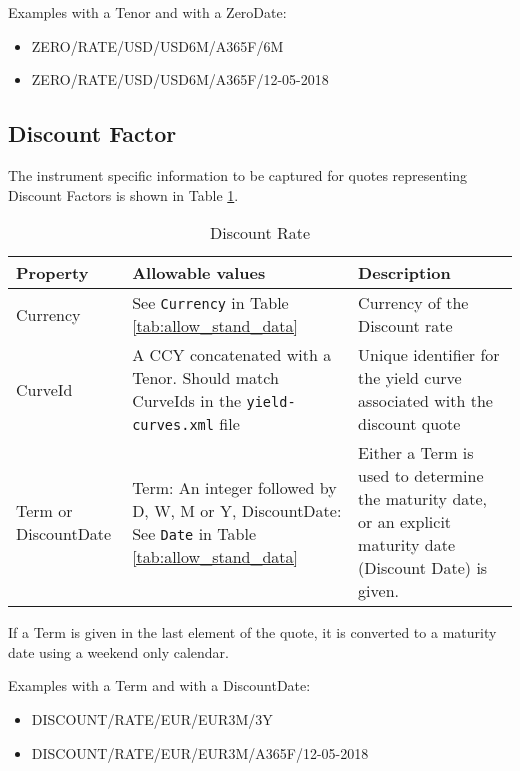 \medskip
Examples with a Tenor and with a ZeroDate: 
\begin{itemize}
\item {ZERO/RATE/USD/USD6M/A365F/6M}
\item {ZERO/RATE/USD/USD6M/A365F/12-05-2018}
\end{itemize}


\subsection{Discount Factor}\label{ss:discount_rate}

The instrument specific information to be captured for quotes representing Discount Factors is shown in Table \ref{tab:discount_quote}.

\begin{table}[H]
\centering
\begin{tabular}{|p{3.3cm}|p{5cm}|p{7cm}|}
\hline
{\bf Property} & {\bf Allowable values} & {\bf Description} \\
\hline
Currency & See \lstinline!Currency! in Table \ref{tab:allow_stand_data} & Currency of the Discount rate\\ \hline
CurveId& A CCY concatenated with a Tenor. Should match CurveIds in the {\tt yield-curves.xml} file & Unique identifier for the yield curve associated with the discount quote\\ \hline
Term or DiscountDate & Term: An integer followed by D, W, M or Y, DiscountDate: See \lstinline!Date! in Table \ref{tab:allow_stand_data} & Either a Term is used to determine the maturity date, or an explicit maturity date (Discount Date) is given.\\
\hline
\end{tabular}
  \caption{Discount Rate}
  \label{tab:discount_quote}
\end{table}

If a Term is given in the last element of the quote, it is converted to a maturity date using a weekend only calendar.

\medskip
Examples with a Term and with a DiscountDate: 
\begin{itemize}
\item {DISCOUNT/RATE/EUR/EUR3M/3Y}
\item {DISCOUNT/RATE/EUR/EUR3M/A365F/12-05-2018}
\end{itemize}

